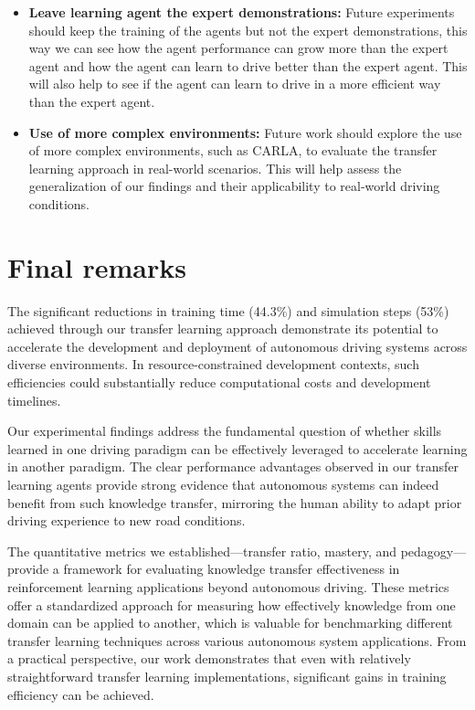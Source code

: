 \begin{itemize}
    \item \textbf{Leave learning agent the expert demonstrations:} Future experiments should keep the training of the agents but not the expert demonstrations, this way we can see how the agent performance can grow more than the expert agent and how the agent can learn to drive better than the expert agent. This will also help to see if the agent can learn to drive in a more efficient way than the expert agent.

    \item \textbf{Use of more complex environments:} Future work should explore the use of more complex environments, such as CARLA, to evaluate the transfer learning approach in real-world scenarios. This will help assess the generalization of our findings and their applicability to real-world driving conditions.

\end{itemize}

\section{Final remarks}
The significant reductions in training time (44.3\%) and simulation steps (53\%) achieved through our transfer learning approach demonstrate its potential to accelerate the development and deployment of autonomous driving systems across diverse environments. In resource-constrained development contexts, such efficiencies could substantially reduce computational costs and development timelines.

Our experimental findings address the fundamental question of whether skills learned in one driving paradigm can be effectively leveraged to accelerate learning in another paradigm. The clear performance advantages observed in our transfer learning agents provide strong evidence that autonomous systems can indeed benefit from such knowledge transfer, mirroring the human ability to adapt prior driving experience to new road conditions.

The quantitative metrics we established—transfer ratio, mastery, and pedagogy—provide a framework for evaluating knowledge transfer effectiveness in reinforcement learning applications beyond autonomous driving. These metrics offer a standardized approach for measuring how effectively knowledge from one domain can be applied to another, which is valuable for benchmarking different transfer learning techniques across various autonomous system applications. From a practical perspective, our work demonstrates that even with relatively straightforward transfer learning implementations, significant gains in training efficiency can be achieved.


